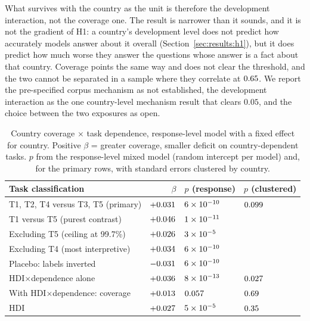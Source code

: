 What survives with the country as the unit is therefore the development
interaction, not the coverage one. The result is narrower than it sounds, and
it is not the gradient of H1: a country's development level does not predict how
accurately models answer about it overall (Section~\ref{sec:results:h1}), but it
does predict how much worse they answer the questions whose answer is a fact
about that country. Coverage points the same way and does not clear the
threshold, and the two cannot be separated in a sample where they correlate at
$0.65$. We report the pre-specified corpus mechanism as not established,
the development interaction as the one country-level mechanism result that
clears $0.05$, and the choice between the two exposures as open.

\begin{table}[h]
\centering
\caption{Country coverage $\times$ task dependence, response-level model with
a fixed effect for country. Positive $\beta$ = greater coverage, smaller deficit
on country-dependent tasks. $p$ from the response-level mixed model (random
intercept per model) and, for the primary rows, with standard errors clustered
by country.}
\label{tab:h4-within}
\footnotesize
\setlength{\tabcolsep}{8pt}
\renewcommand{\arraystretch}{1.15}
\begin{tabular}{lrll}
\toprule
Task classification & $\beta$ & $p$ (response) & $p$ (clustered) \\
\midrule
T1, T2, T4 versus T3, T5 (primary) & $+0.031$ & $6\times10^{-10}$ & $0.099$ \\
T1 versus T5 (purest contrast)     & $+0.046$ & $1\times10^{-11}$ & \\
Excluding T5 (ceiling at 99.7\%)   & $+0.026$ & $3\times10^{-5}$ & \\
Excluding T4 (most interpretive)   & $+0.034$ & $6\times10^{-10}$ & \\
Placebo: labels inverted           & $-0.031$ & $6\times10^{-10}$ & \\
HDI$\times$dependence alone        & $+0.036$ & $8\times10^{-13}$ & $0.027$ \\
With HDI$\times$dependence: coverage & $+0.013$ & $0.057$ & $0.69$ \\
\quad HDI                          & $+0.027$ & $5\times10^{-5}$ & $0.35$ \\
\bottomrule
\end{tabular}
\end{table}

